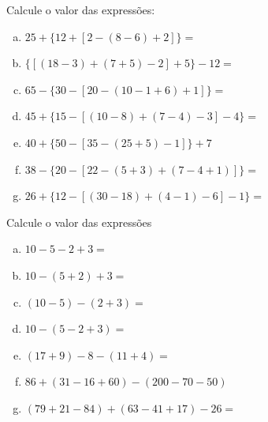 	\item Calcule o valor das expressões:
	\begin{multicols}{2}
	\begin{enumerate}[a)]
		\item $25 + \{ 12 + [ 2 - ( 8 - 6 ) + 2 ]\} =$
		\item $\{ [ ( 18 - 3 ) + ( 7 + 5) - 2 ] + 5 \} - 12 =$
		\item $65 - \{ 30 - [ 20 - ( 10 - 1 + 6) + 1 ]\}= $
		\item $45 + \{ 15 - [ ( 10 - 8 ) + ( 7 - 4) - 3 ] - 4 \} =$
		\item $40 + \{ 50 - [35 - ( 25 +5) - 1 ]\} + 7 $
		\item $38 - \{ 20 - [ 22 - ( 5 + 3) + ( 7 - 4 +1)]\} =$
		\item $26 + \{ 12 - [ ( 30 - 18) + ( 4 - 1) - 6 ] - 1 \} =$
	\end{enumerate}
	\end{multicols}

	\item Calcule o valor das expressões
	\begin{multicols}{2}
	\begin{enumerate}[a)]
		\item $10 - 5 - 2 + 3 =$		
		\item $10 - ( 5 + 2) + 3 =$
		\item $( 10 - 5) - ( 2 + 3) =$
		\item $10 - ( 5 - 2 + 3) =$
		\item $( 17 + 9 ) - 8 - ( 11 + 4) = $
		\item $ 86 + ( 31 - 16 + 60 ) - ( 200 - 70 - 50 ) $
		\item $( 79 + 21 - 84) + ( 63 - 41 + 17 ) - 26 = $		
	\end{enumerate}
	\end{multicols}

